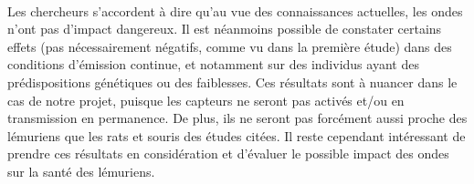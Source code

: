    \paragraph{}Les chercheurs s'accordent à dire qu'au vue des connaissances actuelles, les ondes n'ont pas d'impact dangereux. Il est néanmoins possible de constater certains effets (pas nécessairement négatifs, comme vu dans la première étude) dans des conditions d'émission continue, et notamment sur des individus ayant des prédispositions génétiques ou des faiblesses. Ces résultats sont à nuancer dans le cas de notre projet, puisque les capteurs ne seront pas activés et/ou en transmission en permanence. De plus, ils ne seront pas forcément aussi proche des lémuriens que les rats et souris des études citées. Il reste cependant intéressant de prendre ces résultats en considération et d'évaluer le possible impact des ondes sur la santé des lémuriens.




